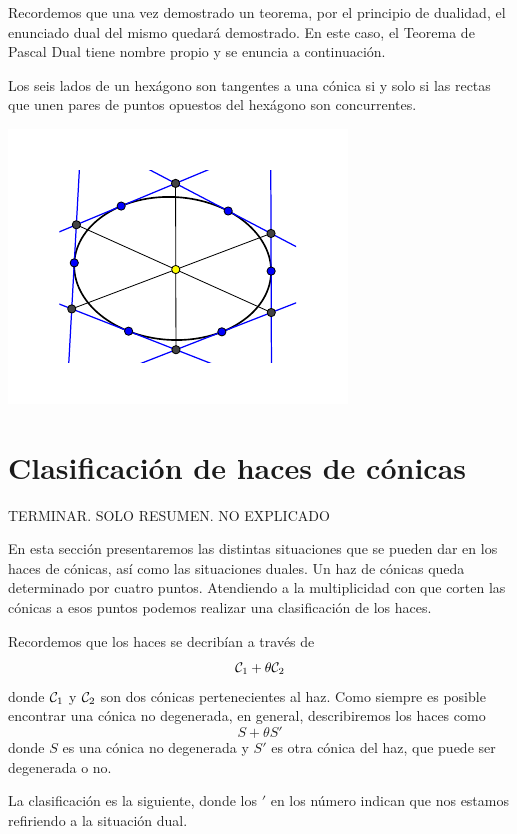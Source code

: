 Recordemos que una vez demostrado un teorema, por el principio de dualidad, el enunciado dual del mismo quedará demostrado. En este caso, el Teorema de Pascal Dual tiene nombre propio y se enuncia a continuación.

\begin{theo}
	Los seis lados de un hexágono son tangentes a una cónica si y solo si las rectas que unen pares de puntos opuestos del hexágono son concurrentes.
	\begin{center}
		\includegraphics[scale=1.1]{Graficos/Conicas/TeoremaBrianchon}
	\end{center}
\end{theo}

\section{Clasificación de haces de cónicas}
TERMINAR. SOLO RESUMEN. NO EXPLICADO

En esta sección presentaremos las distintas situaciones que se pueden dar en los haces de cónicas, así como las situaciones duales. Un haz de cónicas queda determinado por cuatro puntos. Atendiendo a la multiplicidad con que corten las cónicas a esos puntos podemos realizar una clasificación de los haces.

Recordemos que los haces se decribían a través de
\[\mathcal{C}_1+\theta\mathcal{C}_2\]
donde $\mathcal{C}_1$ y $\mathcal{C}_2$ son dos cónicas pertenecientes al haz. Como siempre es posible encontrar una cónica no degenerada, en general, describiremos los haces como
\[S+\theta S'\]
donde $S$ es una cónica no degenerada y $S'$ es otra cónica del haz, que puede ser degenerada o no.

La clasificación es la siguiente, donde los $'$ en los número indican que nos estamos refiriendo a la situación dual.

